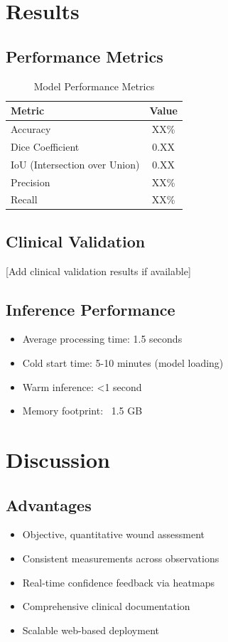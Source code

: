 \documentclass[conference]{IEEEtran}
\begin{document}
\section{Results}

\subsection{Performance Metrics}
\begin{table}[h]
\centering
\caption{Model Performance Metrics}
\begin{tabular}{|l|c|}
\hline
\textbf{Metric} & \textbf{Value} \\
\hline
Accuracy & XX\% \\
Dice Coefficient & 0.XX \\
IoU (Intersection over Union) & 0.XX \\
Precision & XX\% \\
Recall & XX\% \\
\hline
\end{tabular}
\end{table}

\subsection{Clinical Validation}
[Add clinical validation results if available]

\subsection{Inference Performance}
\begin{itemize}
    \item Average processing time: 1.5 seconds
    \item Cold start time: 5-10 minutes (model loading)
    \item Warm inference: <1 second
    \item Memory footprint: ~1.5 GB
\end{itemize}

\section{Discussion}

\subsection{Advantages}
\begin{itemize}
    \item Objective, quantitative wound assessment
    \item Consistent measurements across observations
    \item Real-time confidence feedback via heatmaps
    \item Comprehensive clinical documentation
    \item Scalable web-based deployment
\end{itemize}
\end{document}
